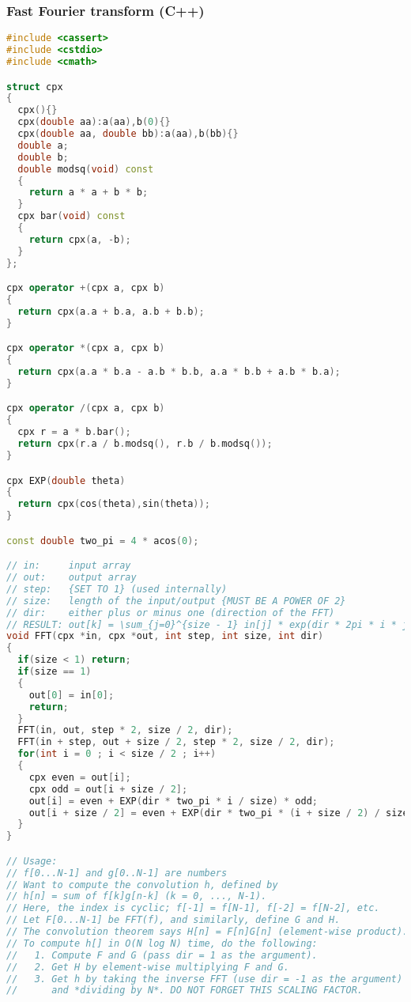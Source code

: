 \subsubsection{Fast Fourier transform (C++)}
\begin{lstlisting}[language=C++]
#include <cassert>
#include <cstdio>
#include <cmath>

struct cpx
{
  cpx(){}
  cpx(double aa):a(aa),b(0){}
  cpx(double aa, double bb):a(aa),b(bb){}
  double a;
  double b;
  double modsq(void) const
  {
    return a * a + b * b;
  }
  cpx bar(void) const
  {
    return cpx(a, -b);
  }
};

cpx operator +(cpx a, cpx b)
{
  return cpx(a.a + b.a, a.b + b.b);
}

cpx operator *(cpx a, cpx b)
{
  return cpx(a.a * b.a - a.b * b.b, a.a * b.b + a.b * b.a);
}

cpx operator /(cpx a, cpx b)
{
  cpx r = a * b.bar();
  return cpx(r.a / b.modsq(), r.b / b.modsq());
}

cpx EXP(double theta)
{
  return cpx(cos(theta),sin(theta));
}

const double two_pi = 4 * acos(0);

// in:     input array
// out:    output array
// step:   {SET TO 1} (used internally)
// size:   length of the input/output {MUST BE A POWER OF 2}
// dir:    either plus or minus one (direction of the FFT)
// RESULT: out[k] = \sum_{j=0}^{size - 1} in[j] * exp(dir * 2pi * i * j * k / size)
void FFT(cpx *in, cpx *out, int step, int size, int dir)
{
  if(size < 1) return;
  if(size == 1)
  {
    out[0] = in[0];
    return;
  }
  FFT(in, out, step * 2, size / 2, dir);
  FFT(in + step, out + size / 2, step * 2, size / 2, dir);
  for(int i = 0 ; i < size / 2 ; i++)
  {
    cpx even = out[i];
    cpx odd = out[i + size / 2];
    out[i] = even + EXP(dir * two_pi * i / size) * odd;
    out[i + size / 2] = even + EXP(dir * two_pi * (i + size / 2) / size) * odd;
  }
}

// Usage:
// f[0...N-1] and g[0..N-1] are numbers
// Want to compute the convolution h, defined by
// h[n] = sum of f[k]g[n-k] (k = 0, ..., N-1).
// Here, the index is cyclic; f[-1] = f[N-1], f[-2] = f[N-2], etc.
// Let F[0...N-1] be FFT(f), and similarly, define G and H.
// The convolution theorem says H[n] = F[n]G[n] (element-wise product).
// To compute h[] in O(N log N) time, do the following:
//   1. Compute F and G (pass dir = 1 as the argument).
//   2. Get H by element-wise multiplying F and G.
//   3. Get h by taking the inverse FFT (use dir = -1 as the argument)
//      and *dividing by N*. DO NOT FORGET THIS SCALING FACTOR.


\end{lstlisting}
